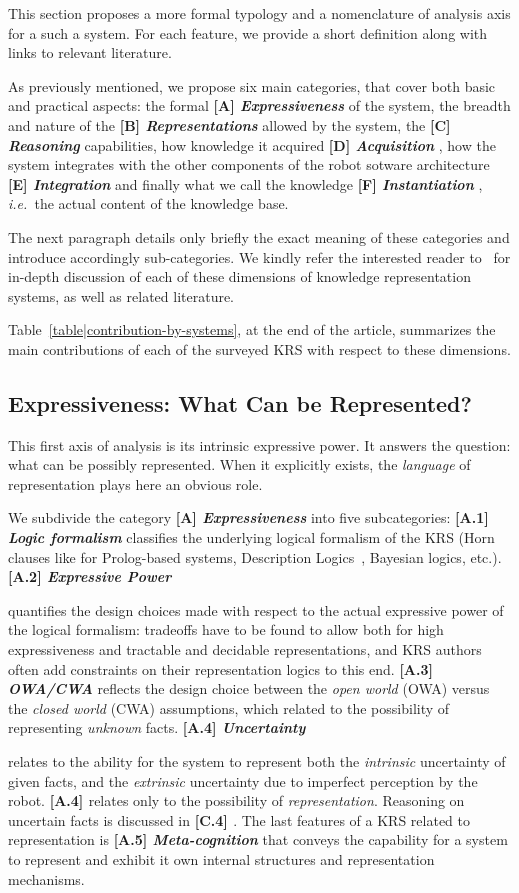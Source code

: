 \documentclass{IEEEtran}
\newcommand{\ie}{{\textit{i.e.\ }}}
\newcommand{\taxon}[2]{%
    \textbf{[#1] \emph{#2}}
}
\begin{document}
This section proposes a more formal typology and a nomenclature of analysis
axis for a such a system. For each feature, we provide a short definition along
with links to relevant literature.

As previously mentioned, we propose six main categories, that cover both basic
and practical aspects: the formal
\taxon{A}{Expressiveness} of the system, the breadth and nature
of the \taxon{B}{Representations} allowed by the system, the
\taxon{C}{Reasoning} capabilities, how knowledge it acquired
\taxon{D}{Acquisition}, how the system integrates with the other components of
the robot sotware architecture \taxon{E}{Integration} and finally what we call
the knowledge \taxon{F}{Instantiation}, \ie the actual content of the knowledge
base.

The next paragraph details only briefly the exact meaning of these categories
and introduce accordingly sub-categories. We kindly refer the interested reader
to~\cite{lemaignan2012symbolic} for in-depth discussion of each of these
dimensions of knowledge representation systems, as well as related literature.

Table~\ref{table|contribution-by-systems}, at the end of the article, summarizes
the main contributions of each of the surveyed KRS with respect to these
dimensions.

\subsection{Expressiveness: What Can be Represented?}
\label{sect|expressiveness}

This first axis of analysis is its intrinsic expressive power. It answers the
question: what can be possibly represented. When it explicitly exists, the
\emph{language} of representation plays here an obvious role.

We subdivide the category \taxon{A}{Expressiveness} into five subcategories:
\taxon{A.1}{Logic formalism} classifies the underlying logical formalism of the
KRS (Horn clauses like for Prolog-based systems, Description
Logics~\cite{Baader2008}, Bayesian logics, etc.). \taxon{A.2}{Expressive Power}
quantifies the design choices made with respect to the actual expressive power
of the logical formalism: tradeoffs have to be found to allow both for high
expressiveness and tractable and decidable representations, and KRS authors
often add constraints on their representation logics to this end.
\taxon{A.3}{OWA/CWA} reflects the design choice between the \emph{open world}
(OWA) versus the \emph{closed world} (CWA) assumptions, which related to the
possibility of representing \emph{unknown} facts. \taxon{A.4}{Uncertainty}
relates to the ability for the system to represent both the \emph{intrinsic}
uncertainty of given facts, and the \emph{extrinsic} uncertainty due to
imperfect perception by the robot. \taxon{A.4}{} relates only to the possibility
of \emph{representation}. Reasoning on uncertain facts is discussed in
\taxon{C.4}{}. The last features of a KRS related to representation is
\taxon{A.5}{Meta-cognition} that conveys the capability for a system to
represent and exhibit it own internal structures and representation mechanisms.
\end{document}
